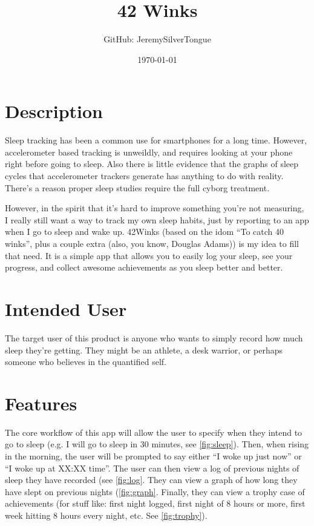 \documentclass[twoside, letterpaper, american]{article}
\begin{document}
\title{42 Winks}
\author{GitHub: JeremySilverTongue}
\date{\today}

\maketitle


\section*{Description}

Sleep tracking has been a common use for smartphones for a long time. However, accelerometer based tracking is unweildly, and requires looking at your phone right before going to sleep. Also there is little evidence that the graphs of sleep cycles that accelerometer trackers generate has anything to do with reality. There's a reason proper sleep studies require the full cyborg treatment.

However, in the spirit that it's hard to improve something you're not measuring, I really still want a way to track my own sleep habits, just by reporting to an app when I go to sleep and wake up. 42Winks (based on the idom ``To catch 40 winks'', plus a couple extra (also, you know, Douglas Adams)) is my idea to fill that need. It is a simple app that allows you to easily log your sleep, see your progress, and collect awesome achievements as you sleep better and better.

\section*{Intended User}

The target user of this product is anyone who wants to simply record how much sleep they're getting. They might be an athlete, a desk warrior, or perhaps someone who believes in the quantified self.

\section*{Features}

The core workflow of this app will allow the user to specify when they intend to go to sleep (e.g. I will go to sleep in 30 minutes, see \cref{fig:sleep}). Then, when rising in the morning, the user will be prompted to say either ``I woke up just now'' or ``I woke up at XX:XX time''. The user can then view a log of previous nights of sleep they have recorded (see \cref{fig:log}. They can view a graph of how long they have slept on previous nights (\cref{fig:graph}. Finally, they can view a trophy case of achievements (for stuff like: first night logged, first night of 8 hours or more, first week hitting 8 hours every night, etc. See \cref{fig:trophy}).
\end{document}
